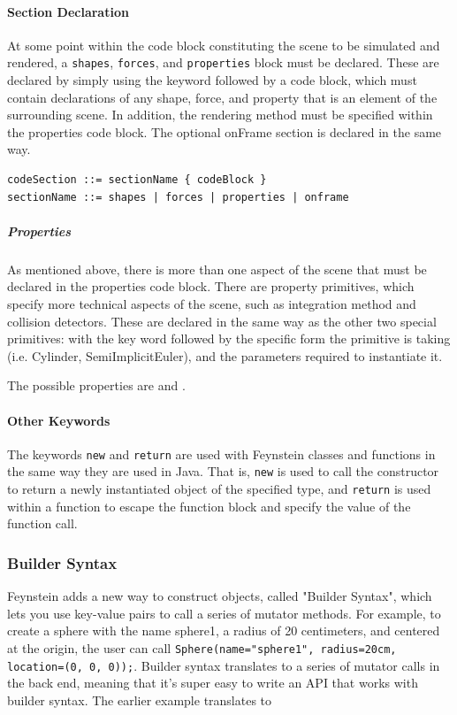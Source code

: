
\paragraph{Section Declaration}

At some point within the code block constituting the scene to be
simulated and rendered, a \texttt{shapes}, \texttt{forces}, and \texttt{properties} block
must be declared.  These are declared by simply using the keyword
followed by a code block, which must contain declarations of any
shape, force, and property that is an element of the surrounding
scene.  In addition, the rendering method must be specified within the
properties code block.  The optional onFrame section is declared in
the same way.

\begin{verbatim}
codeSection ::= sectionName { codeBlock }
sectionName ::= shapes | forces | properties | onframe
\end{verbatim}

\subparagraph{Properties}

As mentioned above, there is more than one aspect of the scene that
must be declared in the properties code block.  There are property
primitives, which specify more technical aspects of the scene, such as
integration method and collision detectors.  These are declared in the
same way as the other two special primitives: with the key word
followed by the specific form the primitive is taking (i.e. Cylinder,
SemiImplicitEuler), and the parameters required to instantiate it.

The possible properties are  and .

\paragraph{Other Keywords}

The keywords \texttt{new} and \texttt{return} are used with Feynstein
classes and functions in the same way they are used in Java.  That is,
\texttt{new} is used to call the constructor to return a newly
instantiated object of the specified type, and \texttt{return} is used
within a function to escape the function block and specify the value
of the function call.

\subsubsection{Builder Syntax}
Feynstein adds a new way to construct objects, called "Builder
Syntax", which lets you use key-value pairs to call a series of
mutator methods. For example, to create a sphere with the name
sphere1, a radius of 20 centimeters, and centered at the origin, the
user can call \texttt{Sphere(name="sphere1", radius=20cm, location=(0, 0,
0));}. Builder syntax translates to a series of mutator calls in the
back end, meaning that it's super easy to write an API that works with
builder syntax. The earlier example translates to 

